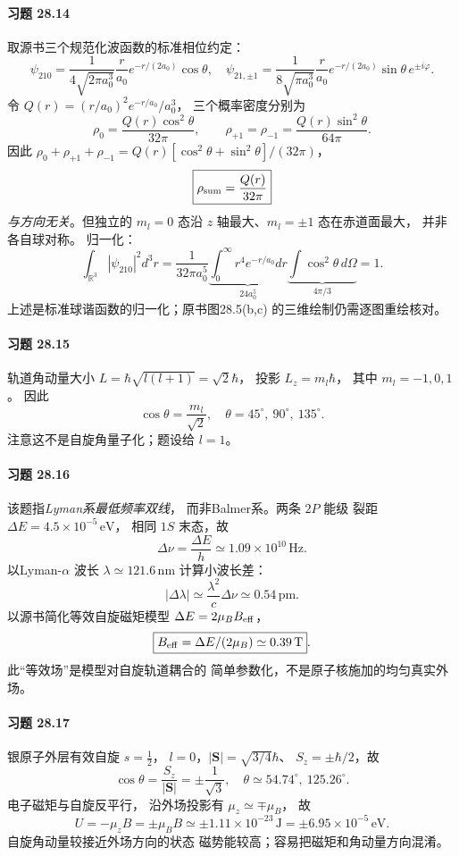 \paragraph{习题 28.14}
取源书三个规范化波函数的标准相位约定：
\[
\psi_{210}=\frac1{4\sqrt{2\pi a_0^3}}
\frac r{a_0}e^{-r/(2a_0)}\cos\theta,\quad
\psi_{21,\pm1}=
\frac1{8\sqrt{\pi a_0^3}}
\frac r{a_0}e^{-r/(2a_0)}
\sin\theta\,e^{\pm i\varphi}.
\]
令 \(Q(r)=(r/a_0)^2e^{-r/a_0}/a_0^3\)，
三个概率密度分别为
\[
\boxed{\rho_0=\frac{Q(r)\cos^2\theta}{32\pi}},
\qquad
\boxed{\rho_{+1}=\rho_{-1}
=\frac{Q(r)\sin^2\theta}{64\pi}}.
\]
因此 \(\rho_0+\rho_{+1}+\rho_{-1}
=Q(r)[\cos^2\theta+\sin^2\theta]/(32\pi)\)，
\[
\boxed{\rho_{\rm sum}=\frac{Q(r)}{32\pi}}
\]
\emph{与方向无关}。但独立的 \(m_l=0\)
态沿 \(z\) 轴最大、\(m_l=\pm1\) 态在赤道面最大，
并非各自球对称。
归一化：
\[
\int_{\mathbb R^3}|\psi_{210}|^2d^3r
=\frac1{32\pi a_0^5}
\underbrace{\int_0^\infty r^4e^{-r/a_0}dr}_{24a_0^5}
\underbrace{\int\cos^2\theta\,d\Omega}_{4\pi/3}
=\boxed{1}.
\]
上述是标准球谐函数的归一化；原书图28.5(b,c)
的三维绘制仍需逐图重绘核对。

\paragraph{习题 28.15}
轨道角动量大小
\(L=\hbar\sqrt{l(l+1)}=\sqrt2\hbar\)，
投影 \(L_z=m_l\hbar\)，
其中 \(m_l=-1,0,1\)。
因此
\[
\boxed{\cos\theta=\frac{m_l}{\sqrt2}},
\quad
\boxed{\theta=45^\circ,\ 90^\circ,\ 135^\circ}.
\]
注意这不是自旋角量子化；题设给 \(l=1\)。

\paragraph{习题 28.16}
该题指\emph{Lyman系最低频率双线}，
而非Balmer系。两条 \(2P\) 能级
裂距 \(\Delta E=4.5\times10^{-5}\,\mathrm{eV}\)，
相同 \(1S\) 末态，故
\[
\boxed{\Delta\nu=\frac{\Delta E}{h}
\simeq1.09\times10^{10}\,\mathrm{Hz}}.
\]
以Lyman-\(\alpha\) 波长
\(\lambda\simeq121.6\,\mathrm{nm}\) 计算小波长差：
\[
\boxed{|\Delta\lambda|
\simeq\frac{\lambda^2}{c}\Delta\nu
\simeq0.54\,\mathrm{pm}}.
\]
以源书简化等效自旋磁矩模型
\(\Delta E=2\mu_BB_{\rm eff}\)，
\[
\boxed{B_{\rm eff}=\Delta E/(2\mu_B)
\simeq0.39\,\mathrm T}.
\]
此“等效场”是模型对自旋轨道耦合的
简单参数化，不是原子核施加的均匀真实外场。

\paragraph{习题 28.17}
银原子外层有效自旋 \(s=\frac12\)，
\(l=0\)，\(|\boldsymbol S|=\sqrt{3/4}\hbar\)、
\(S_z=\pm\hbar/2\)，故
\[
\boxed{\cos\theta=\frac{S_z}{|\boldsymbol S|}
=\pm\frac1{\sqrt3}},\quad
\boxed{\theta\simeq54.74^\circ,\ 125.26^\circ}.
\]
电子磁矩与自旋反平行，
沿外场投影有 \(\mu_z\simeq\mp\mu_B\)，
故
\[
\boxed{U=-\mu_zB=\pm\mu_BB
\simeq\pm1.11\times10^{-23}\,\mathrm J
=\pm6.95\times10^{-5}\,\mathrm{eV}}.
\]
自旋角动量较接近外场方向的状态
磁势能较高；容易把磁矩和角动量方向混淆。

